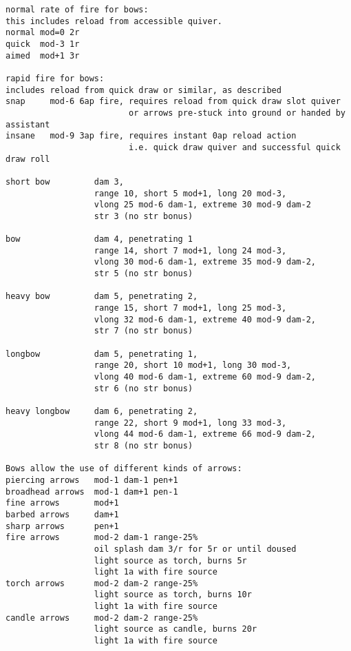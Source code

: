 \small \begin{verbatim}
normal rate of fire for bows:
this includes reload from accessible quiver.
normal mod=0 2r
quick  mod-3 1r
aimed  mod+1 3r

rapid fire for bows:
includes reload from quick draw or similar, as described
snap     mod-6 6ap fire, requires reload from quick draw slot quiver
                         or arrows pre-stuck into ground or handed by assistant
insane   mod-9 3ap fire, requires instant 0ap reload action
                         i.e. quick draw quiver and successful quick draw roll

short bow         dam 3,
                  range 10, short 5 mod+1, long 20 mod-3,
                  vlong 25 mod-6 dam-1, extreme 30 mod-9 dam-2
                  str 3 (no str bonus)

bow               dam 4, penetrating 1
                  range 14, short 7 mod+1, long 24 mod-3,
                  vlong 30 mod-6 dam-1, extreme 35 mod-9 dam-2,
                  str 5 (no str bonus)

heavy bow         dam 5, penetrating 2,
                  range 15, short 7 mod+1, long 25 mod-3,
                  vlong 32 mod-6 dam-1, extreme 40 mod-9 dam-2,
                  str 7 (no str bonus)

longbow           dam 5, penetrating 1,
                  range 20, short 10 mod+1, long 30 mod-3,
                  vlong 40 mod-6 dam-1, extreme 60 mod-9 dam-2,
                  str 6 (no str bonus)

heavy longbow     dam 6, penetrating 2,
                  range 22, short 9 mod+1, long 33 mod-3,
                  vlong 44 mod-6 dam-1, extreme 66 mod-9 dam-2,
                  str 8 (no str bonus)

Bows allow the use of different kinds of arrows:
piercing arrows   mod-1 dam-1 pen+1
broadhead arrows  mod-1 dam+1 pen-1
fine arrows       mod+1
barbed arrows     dam+1
sharp arrows      pen+1
fire arrows       mod-2 dam-1 range-25%
                  oil splash dam 3/r for 5r or until doused
                  light source as torch, burns 5r
                  light 1a with fire source
torch arrows      mod-2 dam-2 range-25%
                  light source as torch, burns 10r
                  light 1a with fire source
candle arrows     mod-2 dam-2 range-25%
                  light source as candle, burns 20r
                  light 1a with fire source



\end{verbatim}
